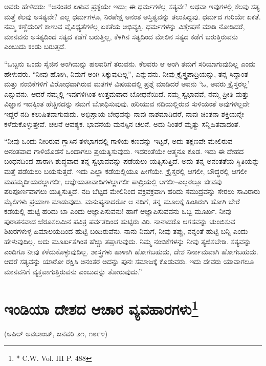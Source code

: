 ಅವರು ಹೇಳಿದರು: “ಅನಂತರ ಏಳುವ ಪ್ರಶ್ನೆಯೇ ಇದು; ಈ ಧರ್ಮಗಳೆಲ್ಲ ಸತ್ಯವೇ? ಅಥವಾ ಇವುಗಳಲ್ಲಿ ಕೆಲವು ಸತ್ಯ ಮತ್ತೆ ಕೆಲವು ಅಸತ್ಯವೇ? ಎಲ್ಲ ಧರ್ಮಗಳೂ, ನಿರಪೇಕ್ಷ ಅನಂತ ಅಸ್ತಿತ್ವವನ್ನು ತಲುಪಿದ್ದವು. ಧರ್ಮದ ಗುರಿಯೇ ಏಕತೆ. ನಮ್ಮ ಕಣ್ಣೆದುರಿಗೆ ಕಾಣುವ ವೈವಿಧ್ಯತೆಗಳೆಲ್ಲ ಏಕತೆಯ ಅಭಿವ್ಯಕ್ತಿ. ಧರ್ಮಗಳನ್ನು ವಿಶ್ಲೇಷಣೆ ಮಾಡಿ ನೋಡಿದರೆ, ಮಾನವನು ಅಸತ್ಯದಿಂದ ಸತ್ಯದ ಕಡೆಗೆ ಬರುತ್ತಿಲ್ಲ, ಕೆಳಗಿನ ಸತ್ಯದಿಂದ ಮೇಲಿನ ಸತ್ಯದ ಕಡೆಗೆ ಬರುತ್ತಿರುವನು ಎಂಬುದು ಕಂಡು ಬರುತ್ತದೆ.

“ಒಬ್ಬನು ಒಂದು ಸೈಜಿನ ಅಂಗಿಯನ್ನು ಹಲವರಿಗೆ ತರುವನು. ಕೆಲವರು ಆ ಅಂಗಿ ತಮಗೆ ಸರಿಯಾಗುವುದಿಲ್ಲ ಎಂದು ಹೇಳುವರು. “ನೀವು ಹೋಗಿ, ನಿಮಗೆ ಅಂಗಿ ಸಿಕ್ಕುವುದಿಲ್ಲ”, ಎನ್ನುವನು. ನೀವು ಕ್ರೈಸ್ತ್ರಪಾದ್ರಿಯನ್ನು, ತನ್ನ ಸಿದ್ದಾಂತ ಮತ್ತು ನಂಬಿಕೆಗಳಿಗೆ ವಿರೋಧವಾಗಿರುವ ಮತಗಳ ವಿಷಯದಲ್ಲಿ ಪ್ರಶ್ನೆ ಮಾಡಿದರೆ ಅವನು ‘ಓ, ಅವರು ಕ್ರೈಸ್ತರಲ್ಲ’ ಎನ್ನುವನು. ಆದರೆ ನಮ್ಮಲ್ಲಿ ಇವುಗಳಿಗಿಂತ ಉತ್ತಮವಾದ ಬೋಧನೆಯಿದೆ. ನಮ್ಮ ಸ್ವಭಾವವೆ, ನಮ್ಮ ಪ್ರೀತಿ ಮತ್ತು ವಿಜ್ಞಾನ ಇದಕ್ಕಿಂತ ಹೆಚ್ಚಿನದನ್ನು ನಮಗೆ ಬೋಧಿಸುವುವು. ಹರಿಯುವ ನದಿಯಲ್ಲಿರುವ ಸುಳಿಯಂತೆ ಅವುಗಳಿಲ್ಲದೇ ಇದ್ದರೆ ನದಿ ಕಲುಷಿತವಾಗುವುದು. ಅಭಿಪ್ರಾಯ ಬೇಧವನ್ನು ನಾವು ನಾಶಮಾಡಿದರೆ, ನಾವು ಚಿಂತನಾ ಶಕ್ತಿಯನ್ನೇ ಕಳೆದುಕೊಳ್ಳುತ್ತೇವೆ. ಚಲನೆ ಆವಶ್ಯಕ. ಭಾವನೆಯೆ ಮನಸ್ಸಿನ ಚಲನೆ. ಅದು ನಿಂತರೆ ಮೃತ್ಯು ಸನ್ನಿಹಿತವಾದಂತೆ.

“ನೀವು ಒಂದು ನೀರಿರುವ ಗ್ಲಾಸಿನ ತಳಭಾಗದಲ್ಲಿ ಗಾಳಿಯ ಕಣವನ್ನು ಇಟ್ಟರೆ, ಅದು ತಕ್ಷಣವೇ ಮೇಲಿರುವ ಅನಂತವಾದ ಗಾಳಿಯೊಡನೆ ಒಂದಾಗಲು ಪ್ರಯತ್ನಿಸುವುದು. ಇದರಂತೆಯೇ ಆತ್ಮನೂ ಕೂಡ. ಇದು ಈ ದೇಹದ ಬಂಧನದಿಂದ ಪಾರಾಗಿ ಶುದ್ಧವಾದ ತನ್ನ ಸ್ವಭಾವವನ್ನು ಪಡೆಯಲು ಯತ್ನಿಸುತ್ತಿದೆ. ಅದು ತನ್ನ ಅನಂತತೆಯ ಸ್ಥಿತಿಯನ್ನು ಮತ್ತೆ ಪಡೆಯಲು ಬಯಸುತ್ತದೆ. ಇದು ಎಲ್ಲಾ ಕಡೆಯಲ್ಲಿಯೂ ಹೀಗೆಯೇ. ಕ್ರೈಸ್ತರಲ್ಲಿ ಆಗಲೀ, ಬೌದ್ಧರಲ್ಲಿ ಆಗಲೀ ಮಹಮ್ಮದೀಯರಲ್ಲಾಗಲೀ, ಆಜ್ಞೇಯತಾವಾದಿಗಳಲ್ಲಾಗಲೀ ಪಾದ್ರಿಯಲ್ಲಿ ಆಗಲೀ–ಎಲ್ಲರಲ್ಲೂ ಜೀವವು ಪರಿಪೂರ್ಣವಾಗಲು ಯತ್ನಿಸುತ್ತಿದೆ. ನದಿ ಬೆಟ್ಟದ ಮೇಲಿನಿಂದ ವಕ್ರವಕ್ರವಾಗಿ ಹರಿದು ಸಮುದ್ರವನ್ನು ಸೇರಲು ಸಾವಿರಾರು ಮೈಲಿಗಳು ಪ್ರಯಾಣ ಮಾಡುವುದು. ಮನುಷ್ಯನಾದರೋ ಆ ನದಿಗೆ, ತನ್ನ ಮೂಲಕ್ಕೆ ಹಿಂತಿರುಗಿ ಹೋಗಿ ಬೇರೆ ಕಡೆಯಲ್ಲಿ ಹುಟ್ಟಿ ಹರಿದು ಬಾ ಎಂದು ಆಜ್ಞಾಪಿಸುವನು! ಹಾಗೆ ಆಜ್ಞಾಪಿಸುವವನು ಒಬ್ಬ ಮೂರ್ಖ. ನೀವು ಪುರಾತನವಾದ ಜೆರೂಸಲಮಿನ ಪವಿತ್ರ ಪರ್ವತದಿಂದ ಹುಟ್ಟಿರು ವಿರಿ. ನಾನಾದರೊ ಆಗಸವನ್ನು ಚುಂಬಿಸುವ ಶಿಖರಗಳುಳ್ಳ ಹಿಮಾಲಯದಿಂದ ಹುಟ್ಟಿ ಬಂದಿರುವೆನು. ನಾನು ನಿಮಗೆ, ನೀವು ತಪ್ಪು, ನನ್ನಂತೆ ಹುಟ್ಟಿ ಬನ್ನಿ ಎಂದು ಹೇಳುವುದಿಲ್ಲ. ಅದು ಮೂರ್ಖತೆಗಿಂತ ಹೆಚ್ಚು ತಪ್ಪಾಗುವುದು. ನಿಮ್ಮ ನಂಬಿಕೆಗಳನ್ನು ನೀವು ತ್ಯಜಿಸಬೇಡಿ. ಸತ್ಯವನ್ನು ಎಂದಿಗೂ ನೀವು ಕಳೆದುಕೊಳ್ಳುವುದಿಲ್ಲ. ಶಾಸ್ತ್ರಗಳು ಹಾಳಾಗಿ ಹೋಗಬಹುದು, ದೇಶ ನಿರ್ನಾಮವಾಗಿ ಹೋಗಬಹುದು. ಆದರೆ ಸತ್ಯವನ್ನು ಯಾರೋ ರಕ್ಷಿಸಿ ಅನಂತರ ಅದನ್ನು ಪುನಃ ಸಮಾಜಕ್ಕೆ ಕೊಡುವರು. ಇದು ದೇವರು ಯಾವಾಗಲೂ ಮಾನವನಿಗೆ ವ್ಯಕ್ತವಾಗುತ್ತಿರುವನು ಎಂಬುದನ್ನು ತೋರುವುದು.”


\section[ಇಂಡಿಯಾ ದೇಶದ ಆಚಾರ ವ್ಯವಹಾರಗಳು]{ಇಂಡಿಯಾ ದೇಶದ ಆಚಾರ ವ್ಯವಹಾರಗಳು\protect\footnote{* C.W. Vol. III P. 488}}

\begin{center}
(ಅಪಿಲ್​ ಅವಲಾಂಚ್​, ಜನವರಿ ೨೧, ೧೮೯೪)
\end{center}

